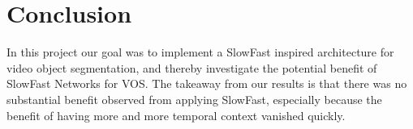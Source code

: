 \section{Conclusion}
In this project our goal was to implement a SlowFast inspired architecture for video object segmentation, and thereby investigate the potential benefit of SlowFast Networks for VOS. The takeaway from our results is that there was no substantial benefit observed from applying SlowFast, especially because the benefit of having more and more temporal context vanished quickly.